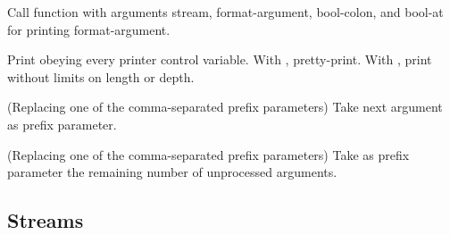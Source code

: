 \begin{LIST}{1cm}
\begin{LIST}{.5cm}
    Call function  with arguments stream, format-argument,
    bool-colon, and bool-at for printing format-argument.

    Print obeying every printer control variable. With \kwd{:},
    pretty-print. With , print without limits on length or depth.

    (Replacing one of the comma-separated prefix parameters) Take next
    argument as prefix parameter.

    \IT{\KWD{\#}} 
    (Replacing one of the comma-separated prefix parameters) Take as
    prefix parameter the remaining number of unprocessed arguments.

  \end{LIST}

\end{LIST}


\subsection{Streams} 

